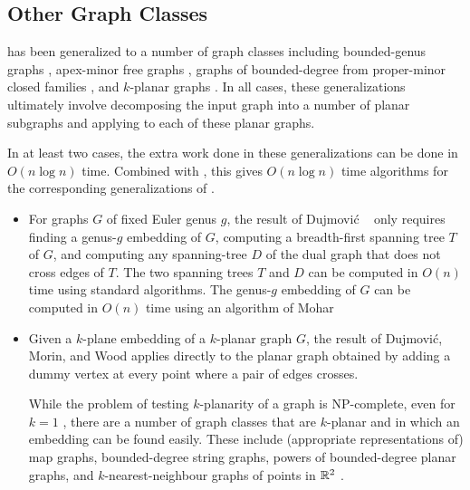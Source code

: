 \documentclass[kpfonts]{patmorin}
\begin{document}
\subsection{Other Graph Classes}

 has been generalized to a number of graph classes including bounded-genus graphs \cite{dujmovic.joret.ea:planar}, apex-minor free graphs \cite{dujmovic.joret.ea:planar}, graphs of bounded-degree from proper-minor closed families \cite{dujmovic.esperet.ea:planar}, and $k$-planar graphs \cite{dujmovic.morin.ea:structure}.  In all cases, these generalizations ultimately involve decomposing the input graph into a number of planar subgraphs and applying  to each of these planar graphs.

In at least two cases, the extra work done in these generalizations can be done in $O(n\log n)$ time.  Combined with , this gives $O(n\log n)$ time algorithms for the corresponding generalizations of .

\begin{itemize}
  \item For graphs $G$ of fixed Euler genus $g$, the result of Dujmović \etal\ \cite{dujmovic.joret.ea:planar} only requires finding a genus-$g$ embedding of $G$, computing a breadth-first spanning tree $T$ of $G$, and computing any spanning-tree $D$ of the dual graph that does not cross edges of $T$.  The two spanning trees $T$ and $D$ can be computed in $O(n)$ time using standard algorithms.  The genus-$g$ embedding of $G$ can be computed in $O(n)$ time using an algorithm of Mohar \cite{mohar:linear}

  \item Given a $k$-plane embedding of a $k$-planar graph $G$, the result of Dujmović, Morin, and Wood \cite{dujmovic.morin.ea:structure} applies  directly to the planar graph obtained by adding a dummy vertex at every point where a pair of edges crosses.

  While the problem of testing $k$-planarity of a graph is NP-complete, even for $k=1$ \cite{grigoriev.bodlaender:algorithms,korzhik.mohar:minimal,urschel.wellens:testing}, there are a number of graph classes that are $k$-planar and in which an embedding can be found easily.  These include (appropriate representations of) map graphs, bounded-degree string graphs, powers of bounded-degree planar graphs, and $k$-nearest-neighbour graphs of points in $\mathbb{R}^2$ \cite[Section~8]{dujmovic.morin.ea:structure}.
\end{itemize}
\end{document}
